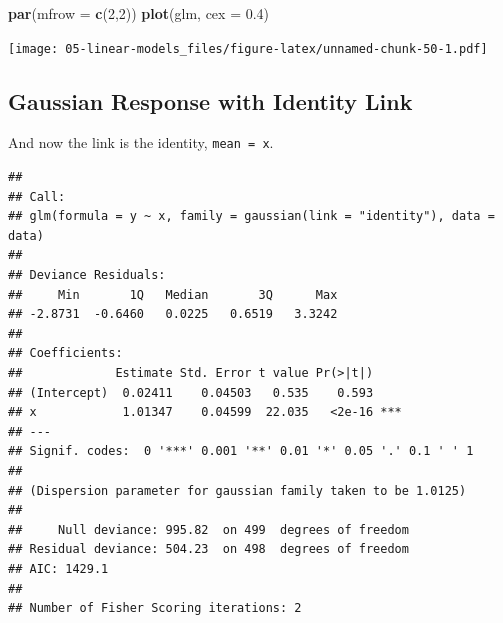 \documentclass[
  openany]{book}
\newenvironment{Shaded}{\begin{snugshade}}{\end{snugshade}}
\newcommand{\ControlFlowTok}[1]{\textcolor[rgb]{0.13,0.29,0.53}{\textbf{#1}}}
\newcommand{\DataTypeTok}[1]{\textcolor[rgb]{0.13,0.29,0.53}{#1}}
\newcommand{\DecValTok}[1]{\textcolor[rgb]{0.00,0.00,0.81}{#1}}
\newcommand{\FloatTok}[1]{\textcolor[rgb]{0.00,0.00,0.81}{#1}}
\newcommand{\KeywordTok}[1]{\textcolor[rgb]{0.13,0.29,0.53}{\textbf{#1}}}
\newcommand{\NormalTok}[1]{#1}
\newcommand{\OperatorTok}[1]{\textcolor[rgb]{0.81,0.36,0.00}{\textbf{#1}}}
\newcommand{\StringTok}[1]{\textcolor[rgb]{0.31,0.60,0.02}{#1}}
\begin{document}
\begin{Shaded}
\begin{Highlighting}[]
\KeywordTok{par}\NormalTok{(}\DataTypeTok{mfrow =} \KeywordTok{c}\NormalTok{(}\DecValTok{2}\NormalTok{,}\DecValTok{2}\NormalTok{))}
\KeywordTok{plot}\NormalTok{(glm, }\DataTypeTok{cex =} \FloatTok{0.4}\NormalTok{)}
\end{Highlighting}
\end{Shaded}

\texttt{[image: 05-linear-models\_files/figure-latex/unnamed-chunk-50-1.pdf]}

\hypertarget{gaussian-response-with-identity-link}{%
\subsection{Gaussian Response with Identity Link}\label{gaussian-response-with-identity-link}}

And now the link is the identity, \texttt{mean\ =\ x}.

\begin{Shaded}
\end{Shaded}

\begin{verbatim}
## 
## Call:
## glm(formula = y ~ x, family = gaussian(link = "identity"), data = data)
## 
## Deviance Residuals: 
##     Min       1Q   Median       3Q      Max  
## -2.8731  -0.6460   0.0225   0.6519   3.3242  
## 
## Coefficients:
##             Estimate Std. Error t value Pr(>|t|)    
## (Intercept)  0.02411    0.04503   0.535    0.593    
## x            1.01347    0.04599  22.035   <2e-16 ***
## ---
## Signif. codes:  0 '***' 0.001 '**' 0.01 '*' 0.05 '.' 0.1 ' ' 1
## 
## (Dispersion parameter for gaussian family taken to be 1.0125)
## 
##     Null deviance: 995.82  on 499  degrees of freedom
## Residual deviance: 504.23  on 498  degrees of freedom
## AIC: 1429.1
## 
## Number of Fisher Scoring iterations: 2
\end{verbatim}
\end{document}
